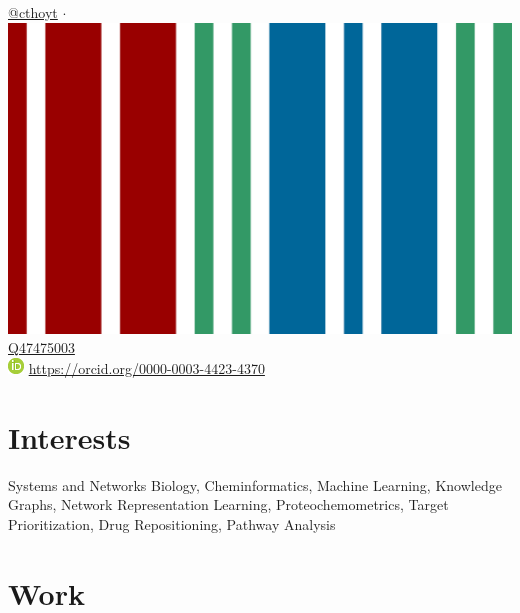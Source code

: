 \documentclass[11pt,a4paper,sans]{moderncv} %
\begin{document}
    \href{https://twitter.com/cthoyt}{@cthoyt}
    $\cdot$
    \includegraphics[scale=0.01]{img/wikidata_logo.png}
    \href{https://www.wikidata.org/wiki/Q47475003}{Q47475003}
    \\
    \includegraphics[scale=0.5]{img/ORCIDiD_icon16x16.png}
    \href{https://orcid.org/0000-0003-4423-4370}{https://orcid.org/0000-0003-4423-4370}


    \section{Interests}\label{sec:interests}

    Systems and Networks Biology, Cheminformatics, Machine Learning, Knowledge Graphs, Network Representation Learning, Proteochemometrics, Target Prioritization, Drug Repositioning, Pathway Analysis



    \section{Work}




\end{document}
